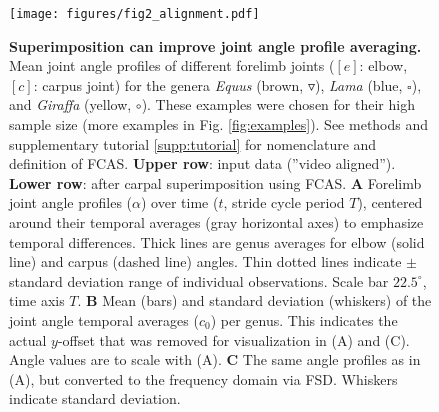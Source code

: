 \begin{figure}[p]%
\centering
\texttt{[image: figures/fig2\_alignment.pdf]}
\caption{\textbf{Superimposition can improve joint angle profile averaging.}
Mean joint angle profiles of different forelimb joints ($[e]$: elbow, $[c]$: carpus joint) for the genera \textit{Equus} (brown, $\triangledown$), \textit{Lama} (blue, $\square$), and \textit{Giraffa} (yellow, $\circ$). These examples were chosen for their high sample size (more examples in Fig. \ref*{fig:examples}). See methods and supplementary tutorial \ref*{supp:tutorial} for nomenclature and definition of FCAS.
\textbf{Upper row}: input data (''video aligned''). \textbf{Lower row}: after carpal superimposition using FCAS.
\textbf{A} Forelimb joint angle profiles ($\alpha$) over time ($t$, stride cycle period $T$), centered around their temporal averages (gray horizontal axes) to emphasize temporal differences. Thick lines are genus averages for elbow (solid line) and carpus (dashed line) angles. Thin dotted lines indicate $\pm$standard deviation range of individual observations. Scale bar $22.5^{\circ}$, time axis $T$.
\textbf{B} Mean (bars) and standard deviation (whiskers) of the joint angle temporal averages ($c_0$) per genus. This indicates the actual $y$-offset that was removed for visualization in (A) and (C). Angle values are to scale with (A).
\textbf{C} The same angle profiles as in (A), but converted to the frequency domain via FSD. Whiskers indicate standard deviation. }
\label{fig:superimposition}
\end{figure}


